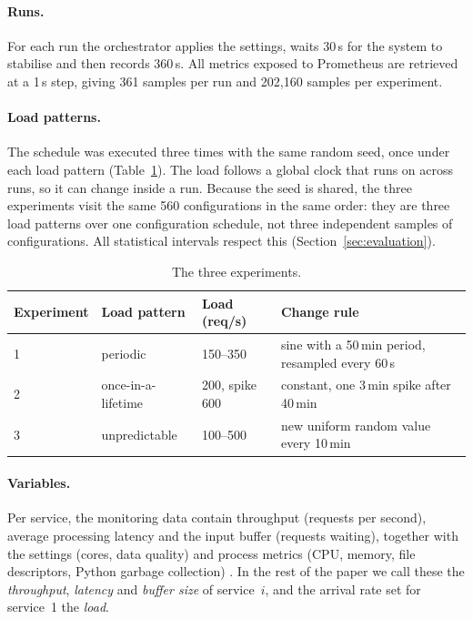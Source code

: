 \paragraph{Runs.}
For each run the orchestrator applies the settings, waits 30\,s for the system to stabilise and then records 360\,s.
All metrics exposed to Prometheus are retrieved at a 1\,s step, giving 361 samples per run and 202{,}160 samples per experiment.

\paragraph{Load patterns.}
The schedule was executed three times with the same random seed, once under each load pattern (Table~\ref{tab:patterns}).
The load follows a global clock that runs on across runs, so it can change inside a run.
Because the seed is shared, the three experiments visit the same 560 configurations in the same order: they are three load patterns over one configuration schedule, not three independent samples of configurations.
All statistical intervals respect this (Section~\ref{sec:evaluation}).

\begin{table}[t]
  \centering
  \caption{The three experiments.}
  \label{tab:patterns}
  \begin{tabular}{llll}
    \toprule
    Experiment & Load pattern & Load (req/s) & Change rule \\
    \midrule
    1 & periodic           & 150--350         & sine with a 50\,min period, resampled every 60\,s \\
    2 & once-in-a-lifetime & 200, spike 600   & constant, one 3\,min spike after 40\,min \\
    3 & unpredictable      & 100--500         & new uniform random value every 10\,min \\
    \bottomrule
  \end{tabular}
\end{table}

\paragraph{Variables.}
Per service, the monitoring data contain throughput (requests per second), average processing latency and the input buffer (requests waiting), together with the settings (cores, data quality) and process metrics (CPU, memory, file descriptors, Python garbage collection) .
In the rest of the paper we call these the \emph{throughput}, \emph{latency} and \emph{buffer size} of service~$i$, and the arrival rate set for service~1 the \emph{load}.

